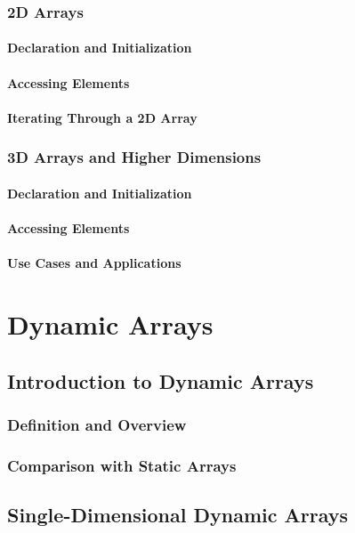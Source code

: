 \documentclass[12pt, oneside]{book}
\begin{document}
	\subsection{2D Arrays}
	\subsubsection{Declaration and Initialization}
	\subsubsection{Accessing Elements}
	\subsubsection{Iterating Through a 2D Array}
	\subsection{3D Arrays and Higher Dimensions}
	\subsubsection{Declaration and Initialization}
	\subsubsection{Accessing Elements}
	\subsubsection{Use Cases and Applications}
	\chapter{Dynamic Arrays}
	\section{Introduction to Dynamic Arrays}
	\subsection{Definition and Overview}
	\subsection{Comparison with Static Arrays}
	
	\section{Single-Dimensional Dynamic Arrays}
\end{document}

